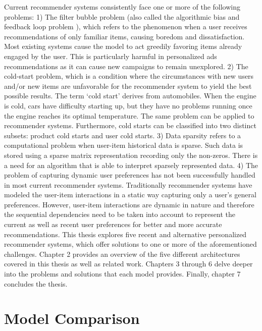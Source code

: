 Current recommender systems consistently face one or more of the following problems: 1) The filter bubble problem (also called the algorithmic bias and feedback loop problem ), which refers to the phenomenon when a user receives recommendations of only familiar items, causing boredom and dissatisfaction. Most existing systems cause the model to act greedily favoring items already engaged by the user. This is particularly harmful in personalized ads recommendations as it can cause new campaigns to remain unexplored. 2) The cold-start problem, which is a condition where the circumstances  with new users and/or new items are unfavorable for the recommender system to yield the best possible results. The term ‘cold start’ derives from automobiles. When the engine is cold, cars have difficulty starting up, but they have no problems running once the engine reaches its optimal temperature. The same problem can be applied to recommender systems. Furthermore, cold starts can be classified into two distinct subsets: product cold starts and user cold starts. 3) Data sparsity refers to a computational problem  when user-item historical data is sparse. Such data is stored using a sparse matrix representation recording only the non-zeros. There is a need for an algorithm that is able to interpret sparsely represented data. 4) The problem of capturing dynamic user preferences has not been successfully handled in most current recommender systems. Traditionally recommender systems have modeled the user-item interactions in a static way capturing only a user’s general preferences. However, user-item interactions are dynamic in nature and therefore the sequential dependencies need to be taken into account to represent the current as well as recent user preferences for better and more accurate recommendations. This thesis explores five recent and alternative personalized recommender systems, which offer solutions to one or more of the aforementioned challenges. Chapter 2 provides an overview of the five different architectures covered in this thesis as well as related work. Chapters 3 through 6 delve deeper into the problems and solutions that each model provides. Finally, chapter 7 concludes the thesis.

\chapter{Model Comparison}
